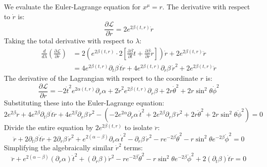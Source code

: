\documentclass[11pt, a4paper]{report}
\begin{document}
We evaluate the Euler-Lagrange equation for $x^\mu = r$. 
The derivative with respect to $\dot{r}$ is:
\begin{equation}
    \frac{\partial \mathcal{L}}{\partial \dot{r}} = 2e^{2\beta(t,r)} \dot{r}
\end{equation}
Taking the total derivative with respect to $\lambda$:
\begin{align}
    \frac{d}{d\lambda} \left( \frac{\partial \mathcal{L}}{\partial \dot{r}} \right) &= 2 \left( e^{2\beta(t,r)} \cdot 2 \left[ \frac{\partial \beta}{\partial t} \dot{t} + \frac{\partial \beta}{\partial r} \dot{r} \right] \right) \dot{r} + 2e^{2\beta(t,r)} \ddot{r} \nonumber \\
    &= 4e^{2\beta(t,r)} \partial_t \beta \, \dot{t}\dot{r} + 4e^{2\beta(t,r)} \partial_r \beta \, \dot{r}^2 + 2e^{2\beta(t,r)} \ddot{r}
\end{align}
The derivative of the Lagrangian with respect to the coordinate $r$ is:
\begin{equation}
    \frac{\partial \mathcal{L}}{\partial r} = -2\dot{t}^2 e^{2\alpha(t,r)} \partial_r \alpha + 2\dot{r}^2 e^{2\beta(t,r)} \partial_r \beta + 2r\dot{\theta}^2 + 2r\sin^2\theta \dot{\phi}^2
\end{equation}
Substituting these into the Euler-Lagrange equation:
\begin{equation}
    2e^{2\beta} \ddot{r} + 4e^{2\beta} \partial_t \beta \, \dot{t}\dot{r} + 4e^{2\beta} \partial_r \beta \, \dot{r}^2 - \left( -2e^{2\alpha} \partial_r \alpha \, \dot{t}^2 + 2e^{2\beta} \partial_r \beta \, \dot{r}^2 + 2r\dot{\theta}^2 + 2r\sin^2\theta \dot{\phi}^2 \right) = 0
\end{equation}
Divide the entire equation by $2e^{2\beta(t,r)}$ to isolate $\ddot{r}$:
\begin{equation}
    \ddot{r} + 2\partial_t \beta \, \dot{t}\dot{r} + 2\partial_r \beta \, \dot{r}^2 + e^{2(\alpha - \beta)} \partial_r \alpha \, \dot{t}^2 - \partial_r \beta \, \dot{r}^2 - r e^{-2\beta} \dot{\theta}^2 - r \sin^2\theta e^{-2\beta} \dot{\phi}^2 = 0
\end{equation}
Simplifying the algebraically similar $\dot{r}^2$ terms:
\begin{equation}
    \ddot{r} + e^{2(\alpha - \beta)} (\partial_r \alpha) \dot{t}^2 + (\partial_r \beta) \dot{r}^2 - r e^{-2\beta} \dot{\theta}^2 - r \sin^2\theta e^{-2\beta} \dot{\phi}^2 + 2 (\partial_t \beta) \dot{t}\dot{r} = 0 \label{eq:geo_r}
\end{equation}
\end{document}
